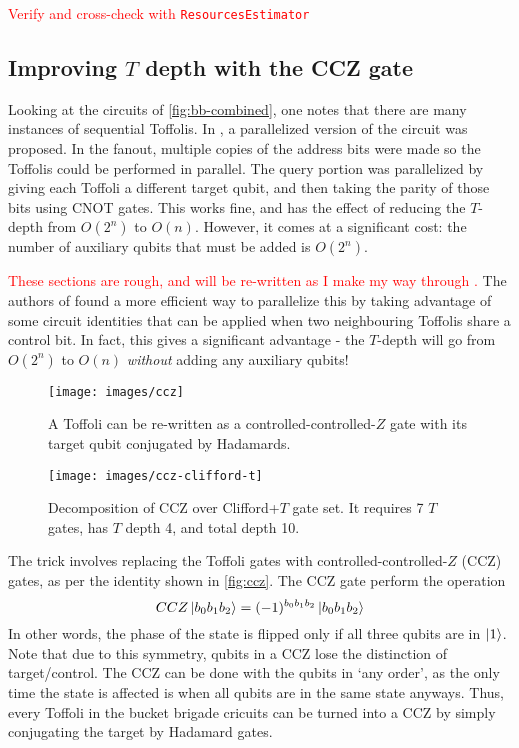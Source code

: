 \documentclass[a4paper,12pt]{article}
\newcommand\todo[1]{\textcolor{red}{#1}}
\begin{document}
\todo{Verify and cross-check with \texttt{ResourcesEstimator}}

\subsection{Improving $T$ depth with the CCZ gate}

Looking at the circuits of \autoref{fig:bb-combined}, one notes that there are many instances of sequential Toffolis. 
In \cite{DiMatteo2020}, a parallelized version of the circuit was proposed. 
In the fanout, multiple copies of the address bits were made so the Toffolis could be performed in parallel. 
The query portion was parallelized by giving each Toffoli a different target qubit, and then taking the parity of those bits using CNOT gates. 
This works fine, and has the effect of reducing the $T$-depth from $O(2^n)$ to $O(n)$. 
However, it comes at a significant cost: the number of auxiliary qubits that must be added is $O(2^n)$.

\todo{These sections are rough, and will be re-written as I make my way through \cite{Alexandru2020}.}
The authors of \cite{Alexandru2020} found a more efficient way to parallelize this by taking advantage of some circuit identities that can be applied when two neighbouring Toffolis share a control bit. 
In fact, this gives a significant advantage - the $T$-depth will go from $O(2^n)$ to $O(n)$ \emph{without} adding any auxiliary qubits!

\begin{figure}
 \centering 
 \captionsetup{width=.89\linewidth}
 \texttt{[image: images/ccz]}
 \caption{A Toffoli can be re-written as a controlled-controlled-$Z$ gate with its target qubit conjugated by Hadamards.}
 \label{fig:ccz}
\end{figure}

\begin{figure}
 \centering
  \captionsetup{width=.89\linewidth}
 \texttt{[image: images/ccz-clifford-t]}
 \caption{Decomposition of CCZ over Clifford+$T$ gate set. It requires 7 $T$ gates, has $T$ depth 4, and total depth 10.}
 \label{fig:ccz-clifford-t}
\end{figure}

The trick involves replacing the Toffoli gates with controlled-controlled-$Z$ (CCZ) gates, as per the identity shown in \autoref{fig:ccz}. The CCZ gate perform the operation
\begin{equation}
 CCZ \ket{b_0 b_1 b_2} = (-1)^{b_0 b_1 b_2} \ket{b_0 b_1 b_2}
\end{equation}
In other words, the phase of the state is flipped only if all three qubits are in $\ket{1}$. Note that due to this symmetry, qubits in a CCZ lose the distinction of target/control. 
The CCZ can be done with the qubits in `any order', as the only time the state is affected is when all qubits are in the same state anyways.
Thus, every Toffoli in the bucket brigade cricuits can be turned into a CCZ by simply conjugating the target by Hadamard gates. 
\end{document}
